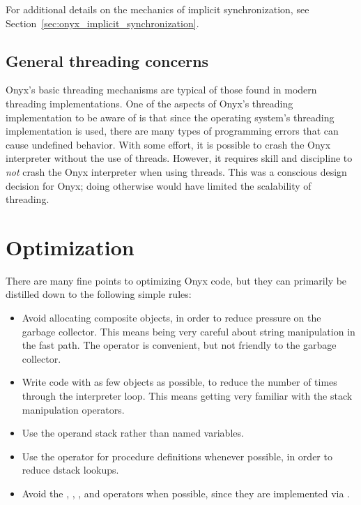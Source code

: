 For additional details on the mechanics of implicit synchronization, see
Section~\ref{sec:onyx_implicit_synchronization}.

\subsection{General threading concerns}

Onyx's basic threading mechanisms are typical of those found in modern threading
implementations.  One of the aspects of Onyx's threading implementation to be
aware of is that since the operating system's threading implementation is used,
there are many types of programming errors that can cause undefined behavior.
With some effort, it is possible to crash the Onyx interpreter without the use
of threads.  However, it requires skill and discipline to {\em not} crash the
Onyx interpreter when using threads.  This was a conscious design decision for
Onyx; doing otherwise would have limited the scalability of threading.

\section{Optimization}

There are many fine points to optimizing Onyx code, but they can primarily be
distilled down to the following simple rules:

\begin{itemize}
\item{Avoid allocating composite objects, in order to reduce pressure on the
  garbage collector.  This means being very careful about string manipulation in
  the fast path.  The  operator is
  convenient, but not friendly to the garbage collector.}
\item{Write code with as few objects as possible, to reduce the number of times
  through the interpreter loop.  This means getting very familiar with the stack
  manipulation operators.}
\item{Use the operand stack rather than named variables.}
\item{Use the  operator for
  procedure definitions whenever possible, in order to reduce dstack lookups.}
\item{Avoid the ,
  ,
  , and
   operators when possible, since
  they are implemented via .}
\end{itemize}

